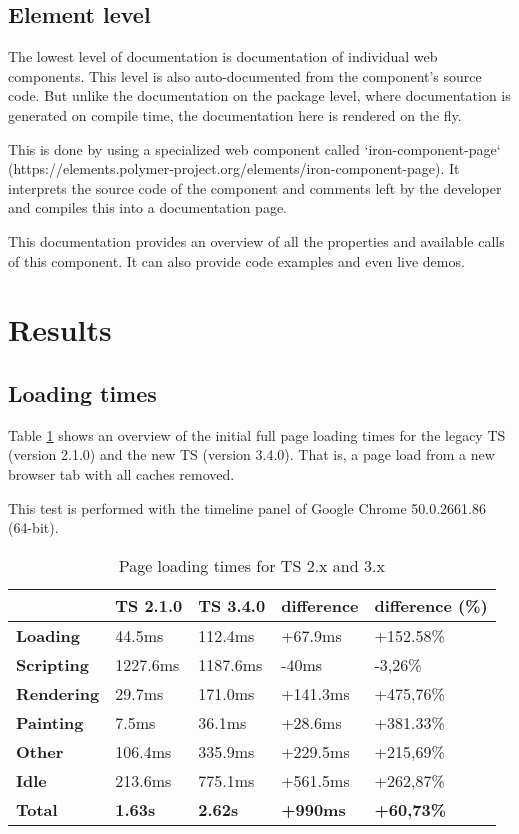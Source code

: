 \documentclass[journal]{IEEEtran}
\begin{document}
\subsection{Element level}
The lowest level of documentation is documentation of individual web components.
This level is also auto-documented from the component's source code.
But unlike the documentation on the package level, where documentation is
generated on compile time, the documentation here is rendered on the fly.

This is done by using a specialized web component called `iron-component-page`
(https://elements.polymer-project.org/elements/iron-component-page).
It interprets the source code of the component and comments left by the developer
and compiles this into a documentation page.

This documentation provides an overview of all the properties and available
calls of this component. It can also provide code examples and even live
demos.

\section{Results}
\subsection{Loading times}
\label{Loading times}
Table \ref{tbl:loadingtimes} shows an overview of the initial full page loading
times for the legacy TS (version 2.1.0) and the new TS (version 3.4.0). That is,
a page load from a new browser tab with all caches removed.

This test is performed with the timeline panel of Google Chrome 50.0.2661.86 (64-bit).

\begin{table}
  \begin{center}
    \begin{tabular}{| l | l | l | l | l |}
    \hline
     & TS 2.1.0 & TS 3.4.0 & difference & difference (\%) \\ \hline
    \textbf{Loading} & 44.5ms & 112.4ms & +67.9ms & +152.58\%  \\ \hline
    \textbf{Scripting} & 1227.6ms & 1187.6ms & -40ms & -3,26\% \\ \hline
    \textbf{Rendering} & 29.7ms & 171.0ms & +141.3ms & +475,76\% \\ \hline
    \textbf{Painting} & 7.5ms & 36.1ms & +28.6ms & +381.33\% \\ \hline
    \textbf{Other} & 106.4ms & 335.9ms & +229.5ms & +215,69\% \\ \hline
    \textbf{Idle} & 213.6ms & 775.1ms & +561.5ms & +262,87\% \\ \hline \hline
    \textbf{Total} & \textbf{1.63s} & \textbf{2.62s} & \textbf{+990ms} & \textbf{+60,73\%} \\ \hline
    \end{tabular}
  \end{center}
  \caption{Page loading times for TS 2.x and 3.x}
  \label{tbl:loadingtimes}
\end{table}
\end{document}
